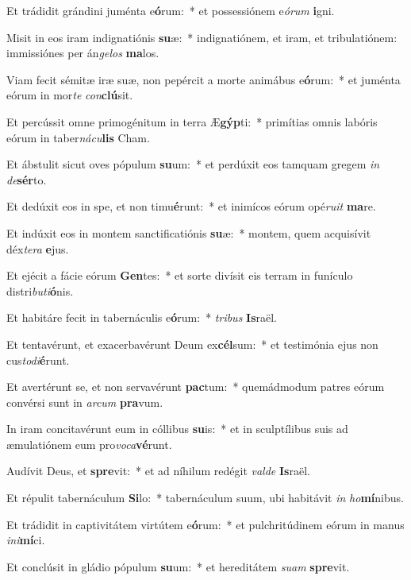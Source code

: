 \item Et trádidit grándini juménta e\textbf{ó}rum:~* et possessiónem e\textit{ó}\textit{rum} \textbf{i}gni.
\item Misit in eos iram indignatiónis \textbf{su}æ:~* indignatiónem, et iram, et tribulatiónem: immissiónes per án\textit{ge}\textit{los} \textbf{ma}los.
\item Viam fecit sémitæ iræ suæ, non pepércit a morte animábus e\textbf{ó}rum:~* et juménta eórum in mor\textit{te} \textit{con}\textbf{clú}sit.
\item Et percússit omne primogénitum in terra Æ\textbf{gýp}ti:~* primítias omnis labóris eórum in taber\textit{ná}\textit{cu}\textbf{lis} Cham.
\item Et ábstulit sicut oves pópulum \textbf{su}um:~* et perdúxit eos tamquam gregem \textit{in} \textit{de}\textbf{sér}to.
\item Et dedúxit eos in spe, et non timu\textbf{é}runt:~* et inimícos eórum opé\textit{ru}\textit{it} \textbf{ma}re.
\item Et indúxit eos in montem sanctificatiónis \textbf{su}æ:~* montem, quem acquisívit déx\textit{te}\textit{ra} \textbf{e}jus.
\item Et ejécit a fácie eórum \textbf{Gen}tes:~* et sorte divísit eis terram in funículo distri\textit{bu}\textit{ti}\textbf{ó}nis.
\item Et habitáre fecit in tabernáculis e\textbf{ó}rum:~* \textit{tri}\textit{bus} \textbf{Is}raël.
\item Et tentavérunt, et exacerbavérunt Deum ex\textbf{cél}sum:~* et testimónia ejus non cus\textit{to}\textit{di}\textbf{é}runt.
\item Et avertérunt se, et non servavérunt \textbf{pac}tum:~* quemádmodum patres eórum convérsi sunt in \textit{ar}\textit{cum} \textbf{pra}vum.
\item In iram concitavérunt eum in cóllibus \textbf{su}is:~* et in sculptílibus suis ad æmulatiónem eum pro\textit{vo}\textit{ca}\textbf{vé}runt.
\item Audívit Deus, et \textbf{spre}vit:~* et ad níhilum redégit \textit{val}\textit{de} \textbf{Is}raël.
\item Et répulit tabernáculum \textbf{Si}lo:~* tabernáculum suum, ubi habitávit \textit{in} \textit{ho}\textbf{mí}nibus.
\item Et trádidit in captivitátem virtútem e\textbf{ó}rum:~* et pulchritúdinem eórum in manus \textit{in}\textit{i}\textbf{mí}ci.
\item Et conclúsit in gládio pópulum \textbf{su}um:~* et hereditátem \textit{su}\textit{am} \textbf{spre}vit.
